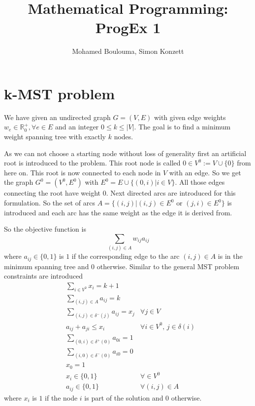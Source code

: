 \documentclass{article}
\author{Mohamed Boulouma, Simon Konzett}
\title{Mathematical Programming: ProgEx 1}
\newcommand{\R}{\mathbb{R}}
\begin{document}
	\maketitle
	\tableofcontents
	
	\section{k-MST problem}
	
	We have given an undirected graph $G = (V,E)$ with given edge weights $w_e \in \R^+_0, \forall e \in E$ and an integer $0 \leq k \leq |V|$. The goal is to find a minimum weight spanning tree with exactly $k$ nodes.
	
	As we can not choose a starting node without loss of generality first an artificial root is introduced to the problem. This root node is called $0 \in V^0 := V \cup \lbrace 0 \rbrace$ from here on. This root is now connected to each node in $V$ with an edge. So we get the graph $G^0 = (V^0, E^0)$ with $E^0 = E \cup \lbrace (0,i) | i \in V \rbrace$. All those edges connecting the root have weight $0$. Next directed arcs are introduced for this formulation. So the set of arcs $A = \lbrace (i,j) | (i,j) \in E^0 \text{ or } (j,i) \in E^0 \rbrace$ is introduced and each arc has the same weight as the edge it is derived from.
	 
	So the objective function is
	\begin{equation}
		\sum_{(i,j) \in A} w_{ij} a_{ij}
	\end{equation}
	where $a_{ij} \in \lbrace 0, 1 \rbrace$ is $1$ if the corresponding edge to the arc $(i,j) \in A$ is in the minimum spanning tree and $0$ otherwise. Similar to the general MST problem constraints are introduced
	\begin{align}
		& \sum_{i \in V^0} x_i = k+1 \label{k_nodes} \\
		& \sum_{(i,j) \in A} a_{ij} = k \label{k_edges} \\			
		& \sum_{(i,j) \in \delta^-(j)} a_{ij} = x_j & \forall j \in V \label{one_predecessor} \\ 
		& a_{ij} + a_{ji} \leq x_i & \forall i \in V^0, \, j \in \delta(i) \label{one_direction} \\		
		& \sum_{(0,i) \in \delta^+(0)} a_{0i} = 1 \label{root_out} \\
		& \sum_{(i,0) \in \delta^-(0)} a_{i0} = 0	\label{root_in} \\	
		& x_0 = 1 \label{root_active} \\
		& x_i \in \lbrace 0,1 \rbrace & \forall \in V^0 \label{nodes} \\
		& a_{ij} \in \lbrace 0,1 \rbrace & \forall (i,j) \in A \label{arcs}
	\end{align}
	where $x_i$ is $1$ if the node $i$ is part of the solution and $0$ otherwise. 
	
\end{document}
